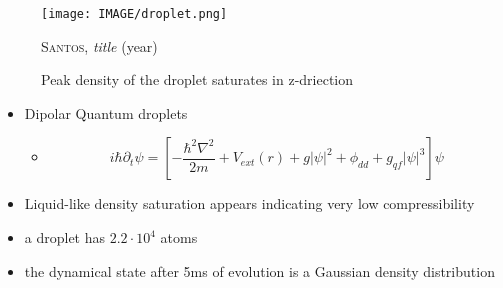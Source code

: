 \begin{figure}[H]
    \centering
    \texttt{[image: IMAGE/droplet.png]}\\
    \caption{Peak density of the droplet saturates in z-driection}
    \textsc{Santos}, \emph{title} (year)
    \label{fig:droplet}
\end{figure}

\begin{itemize}
    \item Dipolar Quantum droplets
    \begin{itemize}
        \item[]
            \begin{equation}
              i \hbar \partial_{t} \psi = \left[ - \frac{\hbar^{2} \nabla^{2}}{2 m} + V_{ext}(r) + g |\psi|^{2} + \phi_{dd} + g_{qf} |\psi|^{3} \right] \psi
            \end{equation}
    \end{itemize}
    \item Liquid-like density saturation appears indicating very low compressibility
    \item a droplet has $2.2 \cdot 10^{4}$ atoms
    \item the dynamical state after 5ms of evolution is a Gaussian density distribution
\end{itemize}
